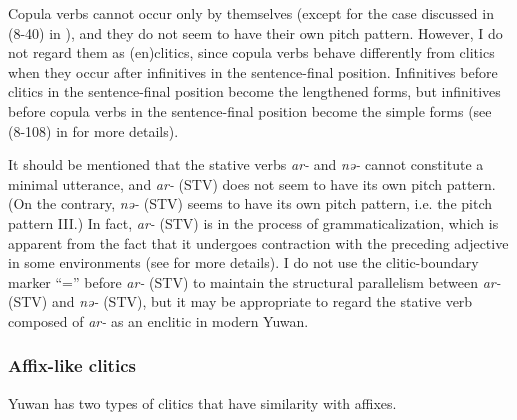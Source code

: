 Copula verbs cannot occur only by themselves (except for the case discussed in (8-40) in ), and they do not seem to have their own pitch pattern. However, I do not regard them as (en)clitics, since copula verbs behave differently from clitics when they occur after infinitives in the sentence-final position. Infinitives before clitics in the sentence-final position become the lengthened forms, but infinitives before copula verbs in the sentence-final position become the simple forms (see (8-108) in  for more details).

It should be mentioned that the stative verbs \textit{ar-} and \textit{nə-} cannot constitute a minimal utterance, and \textit{ar-} (STV) does not seem to have its own pitch pattern. (On the contrary, \textit{nə-} (STV) seems to have its own pitch pattern, i.e. the pitch pattern III.) In fact, \textit{ar-} (STV) is in the process of grammaticalization, which is apparent from the fact that it undergoes contraction with the preceding adjective in some environments (see  for more details). I do not use the clitic-boundary marker “=” before \textit{ar-} (STV) to maintain the structural parallelism between \textit{ar-} (STV) and \textit{nə-} (STV), but it may be appropriate to regard the stative verb composed of \textit{ar-} as an enclitic in modern Yuwan.

\subsubsection{Affix-like clitics}\label{bkm:Ref347227284}\hypertarget{RefHeadingToc395697002}{}
Yuwan has two types of clitics that have similarity with affixes.

